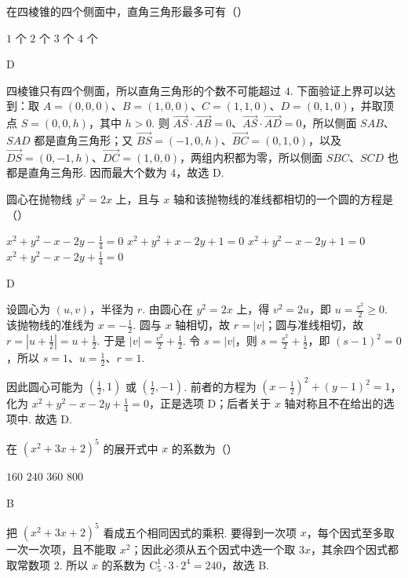 \documentclass[UTF8,a4paper,oneside,11pt]{ctexbook}
\begin{document}
\begin{problem}
在四棱锥的四个侧面中，直角三角形最多可有（\quad）

\choices
    {\(1\) 个}
    {\(2\) 个}
    {\(3\) 个}
    {\(4\) 个}

\begin{answer}
D
\end{answer}

\begin{solution}
四棱锥只有四个侧面，所以直角三角形的个数不可能超过 \(4\). 下面验证上界可以达到：取
\(A=(0,0,0)\)、\(B=(1,0,0)\)、\(C=(1,1,0)\)、\(D=(0,1,0)\)，并取顶点 \(S=(0,0,h)\)，其中 \(h>0\). 则
\(\overrightarrow{AS}\cdot\overrightarrow{AB}=0\)、\(\overrightarrow{AS}\cdot\overrightarrow{AD}=0\)，所以侧面 \(SAB\)、\(SAD\) 都是直角三角形；又
\(\overrightarrow{BS}=(-1,0,h)\)、\(\overrightarrow{BC}=(0,1,0)\)，以及 \(\overrightarrow{DS}=(0,-1,h)\)、\(\overrightarrow{DC}=(1,0,0)\)，两组内积都为零，所以侧面 \(SBC\)、\(SCD\) 也都是直角三角形. 因而最大个数为 \(4\)，故选 D.
\end{solution}
\end{problem}

\begin{problem}
圆心在抛物线 \(y^2=2x\) 上，且与 \(x\) 轴和该抛物线的准线都相切的一个圆的方程是（\quad）

\choices
    {\(x^2+y^2-x-2y-\frac{1}{4}=0\)}
    {\(x^2+y^2+x-2y+1=0\)}
    {\(x^2+y^2-x-2y+1=0\)}
    {\(x^2+y^2-x-2y+\frac{1}{4}=0\)}

\begin{answer}
D
\end{answer}

\begin{solution}
设圆心为 \((u,v)\)，半径为 \(r\). 由圆心在 \(y^2=2x\) 上，得 \(v^2=2u\)，即 \(u=\frac{v^2}{2}\geqslant0\). 该抛物线的准线为 \(x=-\frac12\). 圆与 \(x\) 轴相切，故 \(r=|v|\)；圆与准线相切，故
\(r=\left|u+\frac12\right|=u+\frac12\). 于是
\( |v|=\frac{v^2}{2}+\frac12\). 令 \(s=|v|\)，则 \(s=\frac{s^2}{2}+\frac12\)，即 \((s-1)^2=0\)，所以 \(s=1\)、\(u=\frac12\)、\(r=1\).

因此圆心可能为 \(\left(\frac12,1\right)\) 或 \(\left(\frac12,-1\right)\). 前者的方程为
\(\left(x-\frac12\right)^2+(y-1)^2=1\)，化为 \(x^2+y^2-x-2y+\frac14=0\)，正是选项 D；后者关于 \(x\) 轴对称且不在给出的选项中. 故选 D.
\end{solution}
\end{problem}

\begin{problem}
在 \((x^2+3x+2)^5\) 的展开式中 \(x\) 的系数为（\quad）

\choices
    {\(160\)}
    {\(240\)}
    {\(360\)}
    {\(800\)}

\begin{answer}
B
\end{answer}

\begin{solution}
把 \((x^2+3x+2)^5\) 看成五个相同因式的乘积. 要得到一次项 \(x\)，每个因式至多取一次一次项，且不能取 \(x^2\)；因此必须从五个因式中选一个取 \(3x\)，其余四个因式都取常数项 \(2\). 所以 \(x\) 的系数为
\(\mathrm C_5^1\cdot3\cdot2^4=240\)，故选 B.
\end{solution}
\end{problem}
\end{document}
